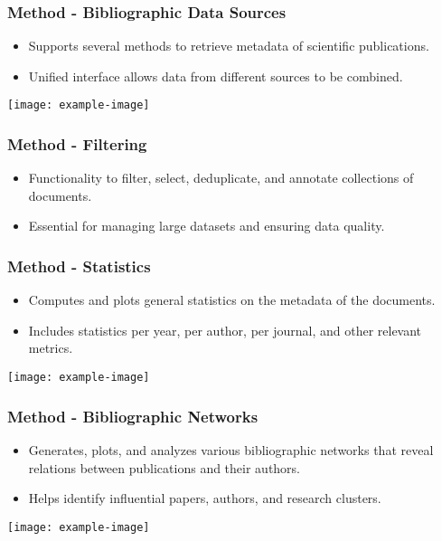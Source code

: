 \documentclass{beamer}
\begin{document}
\begin{frame}
\frametitle{Method - Bibliographic Data Sources}
\begin{itemize}
\item Supports several methods to retrieve metadata of scientific publications.
\item Unified interface allows data from different sources to be combined.
\end{itemize}
\texttt{[image: example-image]}
\end{frame}

\begin{frame}
\frametitle{Method - Filtering}
\begin{itemize}
\item Functionality to filter, select, deduplicate, and annotate collections of documents.
\item Essential for managing large datasets and ensuring data quality.
\end{itemize}
\end{frame}

\begin{frame}
\frametitle{Method - Statistics}
\begin{itemize}
\item Computes and plots general statistics on the metadata of the documents.
\item Includes statistics per year, per author, per journal, and other relevant metrics.
\end{itemize}
\texttt{[image: example-image]}
\end{frame}

\begin{frame}
\frametitle{Method - Bibliographic Networks}
\begin{itemize}
\item Generates, plots, and analyzes various bibliographic networks that reveal relations between publications and their authors.
\item Helps identify influential papers, authors, and research clusters.
\end{itemize}
\texttt{[image: example-image]}
\end{frame}
\end{document}
